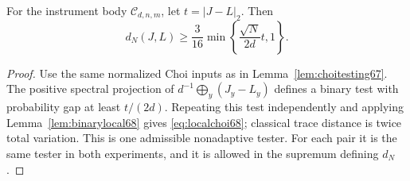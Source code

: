 \begin{corollary}\label{cor:localchoi68}
For the instrument body $\mathcal C_{d,n,m}$, let $t=|J-L|_2$.
Then
\begin{equation}\label{eq:localchoi68}
 d_N(J,L)\ge\frac3{16}
                  \min\left\{\frac{\sqrt N}{2d}t,1\right\}.
\end{equation}
\end{corollary}
\begin{proof}
Use the same normalized Choi inputs as in
Lemma~\ref{lem:choitesting67}. The positive spectral projection of
$d^{-1}\bigoplus_y(J_y-L_y)$ defines a binary test with probability
gap at least $t/(2d)$. Repeating this test independently and applying
Lemma~\ref{lem:binarylocal68} gives \eqref{eq:localchoi68}; classical
trace distance is twice total variation. This is one admissible
nonadaptive tester. For each pair it is the same tester in both
experiments, and it is allowed in the supremum defining $d_N$.
\end{proof}

